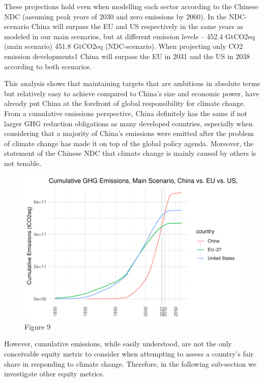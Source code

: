 \documentclass[
  12pt,
]{article}
\numberwithin{equation}{section}
\numberwithin{table}{section}
\numberwithin{figure}{section}
\begin{document}
These projections hold even when modelling each sector according to the
Chinese NDC (assuming peak years of 2030 and zero emissions by 2060). In
the NDC-scenario China will surpass the EU and US respectively in the
same years as modeled in our main scenarios, but at different emission
levels -- 452.4 GtCO2eq (main scenario) 451.8 GtCO2eq (NDC-scenario).
When projecting only CO2 emission developments1 China will surpass the
EU in 2031 and the US in 2038 according to both scenarios.

This analysis shows that maintaining targets that are ambitious in
absolute terms but relatively easy to achieve compared to China's size
and economic power, have already put China at the forefront of global
responsibility for climate change. From a cumulative emissions
perspective, China definitely has the same if not larger GHG reduction
obligations as many developed countries, especially when considering
that a majority of China's emissions were emitted after the problem of
climate change has made it on top of the global policy agenda. Moreover,
the statement of the Chinese NDC that climate change is mainly caused by
others is not tenable.

\begin{figure}
\centering
\includegraphics{Paper_files/figure-latex/unnamed-chunk-9-1.pdf}
\caption{Figure 9}
\end{figure}

However, cumulative emissions, while easily understood, are not the only
conceivable equity metric to consider when attempting to assess a
country's fair share in responding to climate change. Therefore, in the
following sub-section we investigate other equity metrics.
\end{document}
